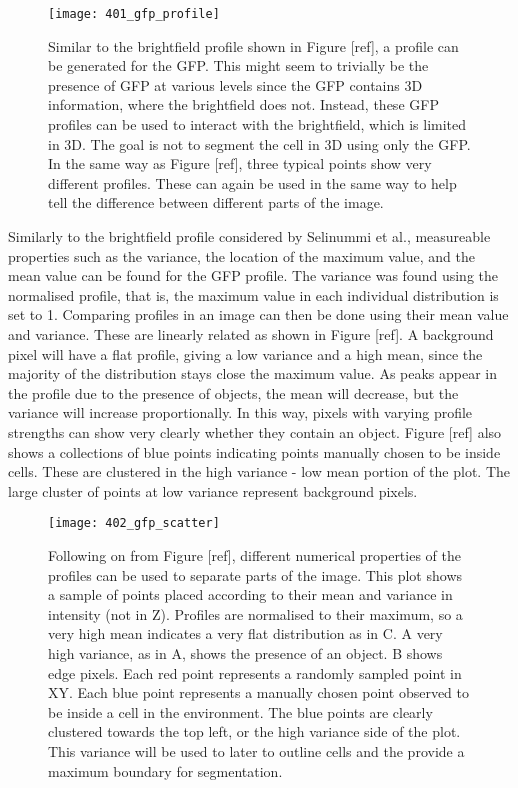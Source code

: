 \begin{figure}[h!]
 \centering
 \texttt{[image: 401\_gfp\_profile]}
 \caption[The GFP profile]{
 	Similar to the brightfield profile shown in Figure [ref], a profile can be generated for the GFP. This might seem to trivially be the presence of GFP at various levels since the GFP contains 3D information, where the brightfield does not. Instead, these GFP profiles can be used to interact with the brightfield, which is limited in 3D. The goal is not to segment the cell in 3D using only the GFP. In the same way as Figure [ref], three typical points show very different profiles. These can again be used in the same way to help tell the difference between different parts of the image.
 }
 \label{fig:gfpprofile}
\end{figure}

Similarly to the brightfield profile considered by Selinummi et al., measureable properties such as the variance, the location of the maximum value, and the mean value can be found for the GFP profile. The variance was found using the normalised profile, that is, the maximum value in each individual distribution is set to 1. Comparing profiles in an image can then be done using their mean value and variance. These are linearly related as shown in Figure [ref]. A background pixel will have a flat profile, giving a low variance and a high mean, since the majority of the distribution stays close the maximum value. As peaks appear in the profile due to the presence of objects, the mean will decrease, but the variance will increase proportionally. In this way, pixels with varying profile strengths can show very clearly whether they contain an object. Figure [ref] also shows a collections of blue points indicating points manually chosen to be inside cells. These are clustered in the high variance - low mean portion of the plot. The large cluster of points at low variance represent background pixels.

\begin{figure}[h!]
 \centering
 \texttt{[image: 402\_gfp\_scatter]}
 \caption[GFP scatter plot]{
 	Following on from Figure [ref], different numerical properties of the profiles can be used to separate parts of the image. This plot shows a sample of points placed according to their mean and variance in intensity (not in Z). Profiles are normalised to their maximum, so a very high mean indicates a very flat distribution as in C. A very high variance, as in A, shows the presence of an object. B shows edge pixels. Each red point represents a randomly sampled point in XY. Each blue point represents a manually chosen point observed to be inside a cell in the environment. The blue points are clearly clustered towards the top left, or the high variance side of the plot. This variance will be used to later to outline cells and the provide a maximum boundary for segmentation.
 }
 \label{fig:gfpscatter}
\end{figure}

